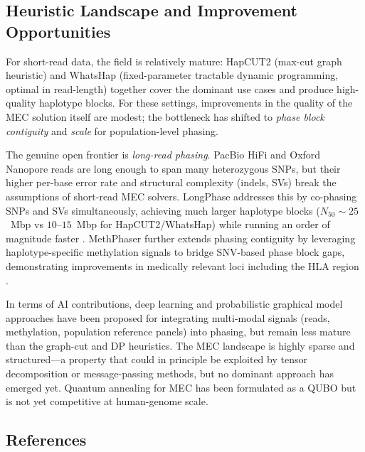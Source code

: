 \documentclass[11pt]{article}
\begin{document}
\subsection*{Heuristic Landscape and Improvement Opportunities}

For short-read data, the field is relatively mature: HapCUT2 (max-cut graph heuristic) 
and WhatsHap (fixed-parameter tractable dynamic programming, optimal in read-length) 
together cover the dominant use cases and produce high-quality haplotype blocks. 
For these settings, improvements in the quality of the MEC solution itself are 
modest; the bottleneck has shifted to \emph{phase block contiguity} and 
\emph{scale} for population-level phasing.

The genuine open frontier is \emph{long-read phasing}. PacBio HiFi and Oxford 
Nanopore reads are long enough to span many heterozygous SNPs, but their higher 
per-base error rate and structural complexity (indels, SVs) break the assumptions 
of short-read MEC solvers. LongPhase addresses this by co-phasing SNPs and SVs 
simultaneously, achieving much larger haplotype blocks ($N_{50} \sim 25$~Mbp vs 
$10$--$15$~Mbp for HapCUT2/WhatsHap) while running an order of magnitude faster 
\cite{LongPhase2022}. MethPhaser further extends phasing contiguity by leveraging 
haplotype-specific methylation signals to bridge SNV-based phase block gaps, 
demonstrating improvements in medically relevant loci including the HLA region 
\cite{MethPhaser2024}.

In terms of AI contributions, deep learning and probabilistic graphical model 
approaches have been proposed for integrating multi-modal signals (reads, methylation, 
population reference panels) into phasing, but remain less mature than the 
graph-cut and DP heuristics. The MEC landscape is highly sparse and structured---a 
property that could in principle be exploited by tensor decomposition or 
message-passing methods, but no dominant approach has emerged yet. Quantum 
annealing for MEC has been formulated as a QUBO but is not yet competitive at 
human-genome scale.

\subsection*{References}
\end{document}
